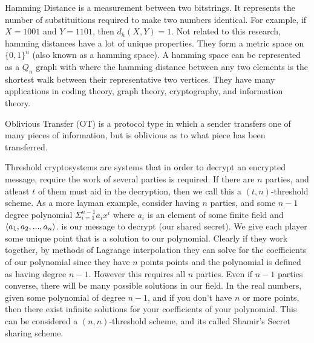 \documentclass[12pt]{article}
\begin{document}
Hamming Distance is a measurement between two bitstrings. It represents the number of substituitions required to make two numbers identical. For example, if $X = 1001$ and $Y = 1101$, then $d_h(X,Y) = 1$. Not related to this research, hamming distances have a lot of unique properties. They form a metric space on $\{0,1\}^n$ (also known as a hamming space). A hamming space can be represented as a $Q_n$ graph with where the hamming distance between any two elements is the shortest walk between their representative two vertices. They have many applications in coding theory, graph theory, cryptography, and information theory.

Oblivious Transfer (OT) is a protocol type in which a sender transfers one of many pieces of information, but is oblivious as to what piece has been transferred.

Threshold cryptosystems are systems that in order to decrypt an encrypted message, require the work of several parties is required. If there are $n$ parties, and atleast $t$ of them must aid in the decryption, then we call this a $(t,n)$-threshold scheme. As a more layman example, consider having $n$ parties, and some $n-1$ degree polynomial $\Sigma_{i=1}^{n-1} a_i x^i$ where $a_i$ is an element of some finite field and $\braket{a_1,a_2,...,a_n}$. is our message to decrypt (our shared secret). We give each player some unique point that is a solution to  our polynomial. Clearly if they work together, by methods of Lagrange interpolation they can solve for the coefficients of our polynomial since they have $n$ points points and the polynomial is defined as having degree $n-1$. However this requires all $n$ parties. Even if $n-1$ parties converse, there will be many possible solutions in our field. In the real numbers, given some polynomial of degree $n-1$, and if you don't have $n$ or more points, then there exist infinite solutions for your coefficients of your polynomial. This can be considered a $(n,n)$-threshold scheme, and its called Shamir's Secret sharing scheme.
\end{document}

